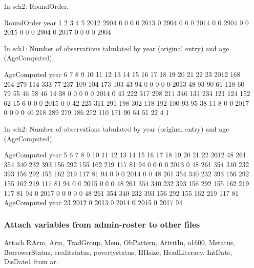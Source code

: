 In \textsf{sch2}: RoundOrder.
\begin{Schunk}
\begin{Soutput}
      RoundOrder
year      1    2    3    4    5
  2012 2904    0    0    0    0
  2013    0 2904    0    0    0
  2014    0    0 2904    0    0
  2015    0    0    0 2904    0
  2017    0    0    0    0 2904
\end{Soutput}
\end{Schunk}
In \textsf{sch1}: Number of observations tabulated by \textsf{year} (original entry) and age (\textsf{AgeComputed}).
\begin{Schunk}
\begin{Soutput}
      AgeComputed
year     6   7   8   9  10  11  12  13  14  15  16  17  18  19  20  21  22  23
  2012 168 264 279 114 333  77 237 109 104 173 103  43  94   0   0   0   0   0
  2013  48  93  90  61 118  60  79  55  46  58  46  14  38   0   0   0   0   0
  2014   0  43 222 317 298 211 346 131 234 121 124 152  62  15   6   0   0   0
  2015   0   0  42 225 311 291 198 302 118 192 100  93  95  38  11   8   0   0
  2017   0   0   0   0  40 218 289 279 186 272 110 171  90  64  51  22   4   1
\end{Soutput}
\end{Schunk}
In \textsf{sch2}: Number of observations tabulated by \textsf{year} (original entry) and age (\textsf{AgeComputed}).
\begin{Schunk}
\begin{Soutput}
      AgeComputed
year     5   6   7   8   9  10  11  12  13  14  15  16  17  18  19  20  21  22
  2012  48 261 354 340 232 393 156 292 155 162 219 117  81  94   0   0   0   0
  2013   0  48 261 354 340 232 393 156 292 155 162 219 117  81  94   0   0   0
  2014   0   0  48 261 354 340 232 393 156 292 155 162 219 117  81  94   0   0
  2015   0   0   0  48 261 354 340 232 393 156 292 155 162 219 117  81  94   0
  2017   0   0   0   0   0  48 261 354 340 232 393 156 292 155 162 219 117  81
      AgeComputed
year    23
  2012   0
  2013   0
  2014   0
  2015   0
  2017  94
\end{Soutput}
\end{Schunk}

\subsubsection{Attach variables from admin-roster to other files}


Attach \textsf{RArm, Arm, TradGroup, Mem, ObPattern, AttritIn, o1600, Mstatus, BorrowerStatus, creditstatus, povertystatus, HHsize, HeadLiteracy, IntDate, DisDate1} from \textsf{ar}.

